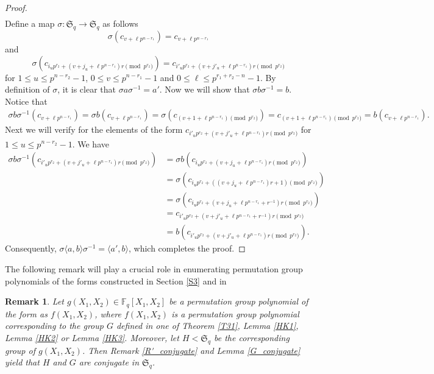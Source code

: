 \documentclass[11pt]{amsart}
\theoremstyle{plain}
\newtheorem{rmk}[thm]{Remark}
\numberwithin{equation}{section}
\def\F{{\mathbb F}}
\begin{document}
\begin{proof}
\begin{equation*}
\begin{split}
  \end{split}
  \end{equation*}
  Define a map $\sigma: \mathfrak{S}_q \rightarrow \mathfrak{S}_q$ as follows 
  $$\sigma(c_{v+\ell p^{n-r_1}})=c_{v+\ell p^{n-r_1}}$$ and 
  $$\sigma\left(c_{i_{u}p^{r_2}+(v+j_{u}+\ell p^{n-r_1})r\pmod{p^{r_2}}}\right)=c_{i'_{u}p^{r_2}+(v+j'_{u}+\ell p^{n-r_1})r\pmod{p^{r_2}}}$$
  for $1 \le u \le p^{n-r_2}-1$, $0 \le v \le p^{n-r_1}-1$ and $0 \le \ell  \le p^{r_1+r_2-n}-1$.  By definition of $\sigma$, it is clear that $\sigma a \sigma^{-1}=a'$. Now we will show that $\sigma b \sigma^{-1}=b$. Notice that 
  \begin{equation*}
  \begin{split}
  \sigma b \sigma^{-1}(c_{v+\ell p^{n-r_1}})= \sigma b(c_{v+\ell p^{n-r_1}})=\sigma (c_{(v+1+\ell p^{n-r_1})\pmod{p^{r_2}}})=c_{(v+1+\ell p^{n-r_1})\pmod{p^{r_2}}}=b(c_{v+\ell p^{n-r_1}}).
  \end{split}
  \end{equation*}
  Next we will verify for the elements of the form $c_{i'_{u}p^{r_2}+(v+j'_{u}+\ell p^{n-r_1})r\pmod{p^{r_2}}}$ for $1 \le u \le p^{n-r_2}-1$. We have 
    \begin{equation*}
  \begin{split}
  \sigma b \sigma^{-1}\left(c_{i'_{u}p^{r_2}+(v+j'_{u}+\ell p^{n-r_1})r\pmod{p^{r_2}}}\right)&= \sigma b\left(c_{i_{u}p^{r_2}+(v+j_{u}+\ell p^{n-r_1})r\pmod{p^{r_2}}}\right)\\&=\sigma \left(c_{i_{u}p^{r_2}+((v+j_{u}+\ell p^{n-r_1})r+1)\pmod{p^{r_2}}}\right)\\&=\sigma \left(c_{i_{u}p^{r_2}+(v+j_{u}+\ell p^{n-r_1}+r^{-1})r\pmod{p^{r_2}}}\right)\\&=c_{i'_{u}p^{r_2}+(v+j'_{u}+\ell p^{n-r_1}+r^{-1})r\pmod{p^{r_2}}}\\&=b\left(c_{i'_{u}p^{r_2}+(v+j'_{u}+\ell p^{n-r_1})r\pmod{p^{r_2}}}\right).
  \end{split}
  \end{equation*}
  Consequently, $\sigma \langle a,b \rangle \sigma^{-1}=\langle a',b \rangle$, which completes the proof.
\end{proof}
The following remark will play a crucial role in enumerating permutation group polynomials of the forms constructed in Section \ref{S3} and in \cite{HK}
\begin{rmk}\label{R_conjugate}
Let $g(X_1,X_2) \in \F_q[X_1,X_2]$ be a permutation group polynomial of the form as $f(X_1,X_2)$, where $f(X_1,X_2)$ is a permutation group polynomial corresponding to the group $G$ defined in one of  Theorem \ref{T31}, Lemma \ref{HK1}, Lemma \ref{HK2} or Lemma \ref{HK3}. Moreover, let $H <\mathfrak{S}_q$ be the corresponding group of $g(X_1,X_2)$. Then Remark \ref{R'_conjugate} and Lemma \ref{G_conjugate} yield that $H$ and $G$ are conjugate in $\mathfrak{S}_q$.   
\end{rmk}
\end{document}
